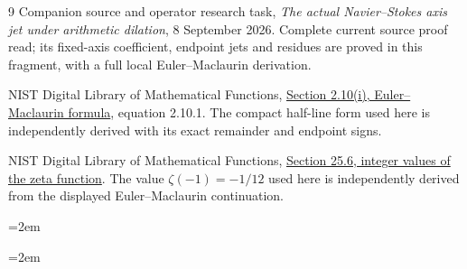 \documentclass[11pt,a4paper]{article}
\theoremstyle{definition}
\theoremstyle{plain}
\begin{document}
\begin{thebibliography}{9}
Companion source and operator research task,
\emph{The actual Navier--Stokes axis jet under arithmetic dilation},
8 September 2026. Complete current source proof read; its fixed-axis
coefficient, endpoint jets and residues are proved in this fragment,
with a full local Euler--Maclaurin derivation.

NIST Digital Library of Mathematical Functions,
\href{https://dlmf.nist.gov/2.10}{Section 2.10(i), Euler--Maclaurin formula},
equation 2.10.1. The compact half-line form used here is independently
derived with its exact remainder and endpoint signs.

NIST Digital Library of Mathematical Functions,
\href{https://dlmf.nist.gov/25.6}{Section 25.6, integer values of the zeta function}.
The value $\zeta(-1)=-1/12$ used here is independently derived from
the displayed Euler--Maclaurin continuation.
\end{thebibliography}
\appendix

\begingroup
\emergencystretch=2em

\endgroup
\clearpage

\clearpage

\clearpage

\clearpage
\begingroup
\emergencystretch=2em

\endgroup
\clearpage

\clearpage

\clearpage

\clearpage

\end{document}
